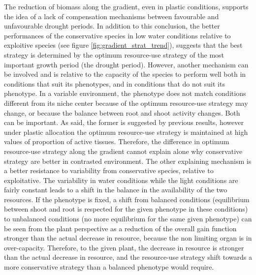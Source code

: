 The reduction of biomass along the gradient, even in plastic conditions, supports the idea of a lack of compensation mechanisms between favourable and unfavourable drought periods. In addition to this conclusion, the better performances of the conservative species in low water conditions relative to exploitive species (see figure \ref{fig:gradient_strat_trend}), suggests that the best strategy is determined by the optimum resource-use strategy of the most important growth period (the drought period). However, another mechanism can be involved and is relative to the capacity of the species to perform well both in conditions that suit its phenotypes, and in conditions that do not suit its phenotype. In a variable environment, the phenotype does not match conditions different from its niche center because of the optimum resource-use strategy may change, or because the balance between root and shoot activity changes. Both can be important. As said, the former is suggested by previous results, however under plastic allocation the optimum resource-use strategy is maintained at high values of proportion of active tissues. Therefore, the difference in optimum resource-use strategy along the gradient cannot explain alone why conservative strategy are better in contrasted environment. The other explaining mechanism is a better resistance to variability from conservative species, relative to exploitative. The variability in water conditions while the light conditions are fairly constant leads to a shift in the balance in the availability of the two resources. If the phenotype is fixed, a shift from balanced conditions (equilibrium between shoot and root is respected for the given phenotype in these conditions) to unbalanced conditions (no more equilibrium for the same given phenotype) can be seen from the plant perspective as a reduction of the overall gain function stronger than the actual decrease in resource, because the non limiting organ is in over-capacity. Therefore, to the given plant, the decrease in resource is stronger than the actual decrease in resource, and the resource-use strategy shift towards a more conservative strategy than a balanced phenotype would require.

